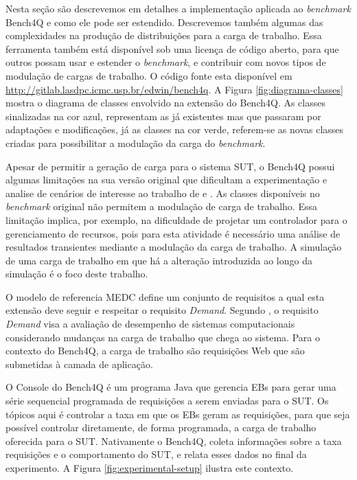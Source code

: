 Nesta seção são descrevemos em detalhes a implementação aplicada ao \textit{benchmark} Bench4Q e como ele pode ser estendido. Descrevemos também algumas das complexidades na produção de distribuições para a carga de trabalho. Essa ferramenta também está disponível sob uma licença de código aberto, para que outros possam usar e estender o \textit{benchmark}, e contribuir com novos tipos de modulação de cargas de trabalho. O código fonte esta disponível em \href{URL}{http://gitlab.lasdpc.icmc.usp.br/edwin/bench4q}. A Figura \ref{fig:diagrama-classes} mostra o diagrama de classes envolvido na extensão do Bench4Q. As classes sinalizadas na cor azul, representam as já existentes mas que passaram por adaptações e modificações, já as classes na cor verde, referem-se as novas classes criadas para possibilitar a modulação da carga do \textit{benchmark}.

Apesar de permitir a geração de carga para o sistema SUT, o Bench4Q possui algumas limitações na sua versão original que dificultam a experimentação e analise de cenários de interesse ao trabalho de  e .
As classes disponíveis no \textit{benchmark} original não permitem a modulação de carga de trabalho. Essa limitação implica, por exemplo, na dificuldade de projetar um controlador para o gerenciamento de recursos, pois para esta atividade é necessário uma análise de resultados transientes mediante a modulação da carga de trabalho. A simulação de uma carga de trabalho em que há a alteração introduzida ao longo da simulação é o foco deste trabalho.

O modelo de referencia MEDC define um conjunto de requisitos a qual esta extensão deve seguir e respeitar o requisito \textit{Demand}. Segundo , o requisito \textit{Demand} visa a avaliação de desempenho de sistemas computacionais considerando mudanças na carga de trabalho que chega ao sistema. Para o contexto do Bench4Q, a carga de trabalho são requisições Web que são submetidas à camada de aplicação. 

O Console do Bench4Q é um programa Java que gerencia EBs para gerar uma série sequencial programada de requisições a serem enviadas para o SUT. 
Os tópicos aqui é controlar a taxa em que os EBs geram as requisições, para que seja possível controlar diretamente, de forma programada, a carga de trabalho oferecida para o SUT. Nativamente o Bench4Q, coleta informações sobre a taxa requisições e o comportamento do SUT, e relata esses dados no final da experimento. A Figura \ref{fig:experimental-setup} ilustra este contexto.

